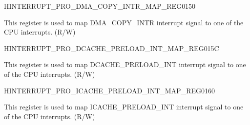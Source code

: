 \begin{register}{H}{INTERRUPT\_PRO\_DMA\_COPY\_INTR\_MAP\_REG}{\hexprefix{}0150}\label{regdesc:INTERRUPTPRODMACOPYINTRMAPREG}
%
%
\regnewline%
\begin{regdesc}\begin{reglist}
\label{fielddesc:INTERRUPTPRODMACOPYINTRMAP}\item [INTERRUPT\_PRO\_DMA\_COPY\_INTR\_MAP] This register is used to map DMA\_COPY\_INTR interrupt signal to one of the CPU interrupts. (R/W)
\end{reglist}\end{regdesc}
\end{register}






\begin{register}{H}{INTERRUPT\_PRO\_DCACHE\_PRELOAD\_INT\_MAP\_REG}{\hexprefix{}015C}\label{regdesc:INTERRUPTPRODCACHEPRELOADINTMAPREG}
%
%
\regnewline%
\begin{regdesc}\begin{reglist}
\label{fielddesc:INTERRUPTPRODCACHEPRELOADINTMAP}\item [INTERRUPT\_PRO\_DCACHE\_PRELOAD\_INT\_MAP] This register is used to map DCACHE\_PRELOAD\_INT interrupt signal to one of the CPU interrupts. (R/W)
\end{reglist}\end{regdesc}
\end{register}


\begin{register}{H}{INTERRUPT\_PRO\_ICACHE\_PRELOAD\_INT\_MAP\_REG}{\hexprefix{}0160}\label{regdesc:INTERRUPTPROICACHEPRELOADINTMAPREG}
%
%
\regnewline%
\begin{regdesc}\begin{reglist}
\label{fielddesc:INTERRUPTPROICACHEPRELOADINTMAP}\item [INTERRUPT\_PRO\_ICACHE\_PRELOAD\_INT\_MAP] This register is used to map ICACHE\_PRELOAD\_INT interrupt signal to one of the CPU interrupts. (R/W)
\end{reglist}\end{regdesc}
\end{register}



